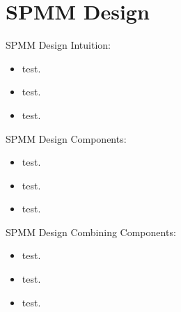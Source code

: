 \section{SPMM Design}
\label{sec:design}

\begin{frame}{SPMM Design}
  Intuition:
  \begin{itemize}
    \item test.
    \item test.
    \item test.
  \end{itemize}
\end{frame}

\begin{frame}{SPMM Design}
  Components:
  \begin{itemize}
    \item test.
    \item test.
    \item test.
  \end{itemize}
\end{frame}

\begin{frame}{SPMM Design}
  Combining Components:
  \begin{itemize}
    \item test.
    \item test.
    \item test.
  \end{itemize}
\end{frame}
